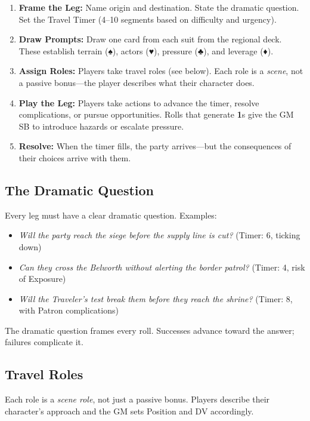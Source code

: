\begin{enumerate}
\item \textbf{Frame the Leg:} Name origin and destination. State the dramatic question. Set the Travel Timer (4--10 segments based on difficulty and urgency).
\item \textbf{Draw Prompts:} Draw one card from each suit from the regional deck. These establish terrain (♠), actors (♥), pressure (♣), and leverage (♦).
\item \textbf{Assign Roles:} Players take travel roles (see below). Each role is a \emph{scene}, not a passive bonus—the player describes what their character does.
\item \textbf{Play the Leg:} Players take actions to advance the timer, resolve complications, or pursue opportunities. Rolls that generate \textbf{1}s give the GM SB to introduce hazards or escalate pressure.
\item \textbf{Resolve:} When the timer fills, the party arrives—but the consequences of their choices arrive with them.
\end{enumerate}

\subsection*{The Dramatic Question}
\label{sec:travel-question}

Every leg must have a clear dramatic question. Examples:

\begin{itemize}
\item \textit{Will the party reach the siege before the supply line is cut?} (Timer: 6, ticking down)
\item \textit{Can they cross the Belworth without alerting the border patrol?} (Timer: 4, risk of Exposure)
\item \textit{Will the Traveler's test break them before they reach the shrine?} (Timer: 8, with Patron complications)
\end{itemize}

The dramatic question frames every roll. Successes advance toward the answer; failures complicate it.

\subsection*{Travel Roles}
\label{sec:travel-roles}

Each role is a \emph{scene role}, not just a passive bonus. Players describe their character's approach and the GM sets Position and DV accordingly.

